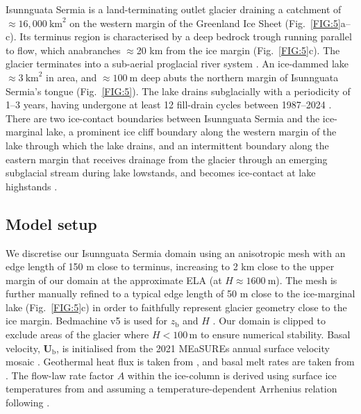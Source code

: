 \documentclass[tc, manuscript]{copernicus}
\begin{document}
Isunnguata Sermia is a land-terminating outlet glacier draining a catchment of $\approx\!16,000\ \mathrm{km}^2$ on the western margin of the Greenland Ice Sheet (Fig.~\ref{FIG:5}a--c). Its terminus region is characterised by a deep bedrock trough running parallel to flow, which anabranches $\approx$20 km from the ice margin (Fig.~\ref{FIG:5}c). The glacier terminates into a sub-aerial proglacial river system \citep{egusphere-2026-2131}. An ice-dammed lake $\approx\!3\ \mathrm{km}^2$ in area, and $\approx\!100\ \mathrm{m}$ deep \citep{livingstone2025ice} abuts the northern margin of Isunnguata Sermia's tongue (Fig.~\ref{FIG:5}). The lake drains subglacially with a periodicity of 1--3 years, having undergone at least 12 fill-drain cycles between 1987--2024 \citep[][Fig.~\ref{FIG:5}g]{livingstone2025ice}. There are two ice-contact boundaries between Isunnguata Sermia and the ice-marginal lake, a prominent ice cliff boundary along the western margin of the lake through which the lake drains, and an intermittent boundary along the eastern margin that receives drainage from the glacier through an emerging subglacial stream during lake lowstands, and becomes ice-contact at lake highstands \citep{livingstone2025ice}.

\subsection{Model setup} \label{application:setup}

We discretise our Isunnguata Sermia domain \citep[derived from][]{lindback2015subglacial} using an anisotropic mesh with an edge length of 150 m close to terminus, increasing to 2 km close to the upper margin of our domain at the approximate ELA (at \( H \approx 1600\ \text{m} \)). The mesh is further manually refined to a typical edge length of 50 m close to the ice-marginal lake (Fig.~\ref{FIG:5}c) in order to faithfully represent glacier geometry close to the ice margin. Bedmachine v5 is used for $z_{\mathrm{b}}$ and $H$ \citep[][Fig.~\ref{FIG:5}b,c]{morlighem2017bedmachine,Morlighem_Et_Al_2022}. Our domain is clipped to exclude areas of the glacier where $H<100 \, \mathrm{m}$ to ensure numerical stability. Basal velocity, $\mathbf{U}_{\mathrm{b}}$, is initialised from the 2021 MEaSUREs annual surface velocity mosaic \citep{MEASURES}. Geothermal heat flux is taken from \citet{shapiro2004inferring}, and basal melt rates are taken from \citet{karlsson2021first}. The flow-law rate factor $A$ within the ice-column is derived using surface ice temperatures from \citet{ettema2009higher} and assuming a temperature-dependent Arrhenius relation following \citet{cuffey2010physics}. 
\end{document}
